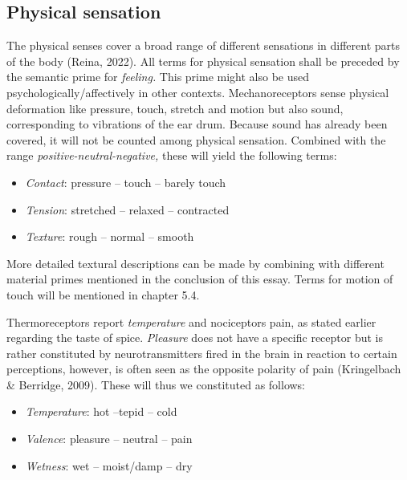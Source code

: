 \subsection{Physical sensation}

The physical senses cover a broad range of different sensations in different parts of the body (Reina, 2022). All terms for physical sensation shall be preceded by the semantic prime for \textit{feeling.} This prime might also be used psychologically/affectively in other contexts. Mechanoreceptors sense physical deformation like pressure, touch, stretch and motion but also sound, corresponding to vibrations of the ear drum. Because sound has already been covered, it will not be counted among physical sensation. Combined with the range \textit{positive-neutral-negative,} these will yield the following terms:  

\begin{itemize}
\item   \textit{Contact}: pressure – touch – barely touch  

\item   \textit{Tension}: stretched – relaxed – contracted  

\item   \textit{Texture}: rough – normal – smooth 
\end{itemize}

More detailed textural descriptions can be made by combining with different material primes mentioned in the conclusion of this essay. Terms for motion of touch will be mentioned in chapter 5.4.  

Thermoreceptors report \textit{temperature} and nociceptors pain, as stated earlier regarding the taste of spice. \textit{Pleasure} does not have a specific receptor but is rather constituted by neurotransmitters fired in the brain in reaction to certain perceptions, however, is often seen as the opposite polarity of pain (Kringelbach \& Berridge, 2009). These will thus we constituted as follows:  


\begin{itemize}
\item   \textit{Temperature}: hot –tepid – cold  

\item   \textit{Valence}: pleasure – neutral – pain  

\item   \textit{Wetness}: wet – moist/damp – dry 
\end{itemize}

